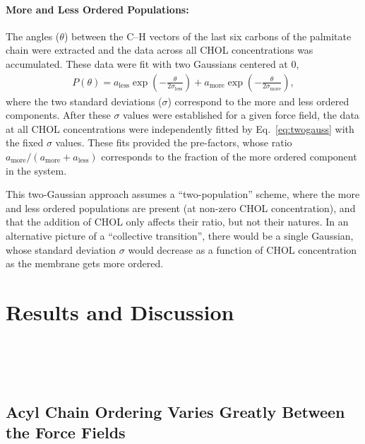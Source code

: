 \documentclass[journal=jctcce]{achemso}
\begin{document}
\paragraph{More and Less Ordered Populations:} The angles ($\theta$) between the C--H vectors of the last six carbons of the palmitate chain were extracted and the data across all CHOL concentrations was accumulated. These data were fit with two Gaussians centered at 0,
%
\begin{align}
    P(\theta)=a_\mathrm{less}\exp\left(-\frac{\theta}{2\sigma_\mathrm{less}}\right)+a_\mathrm{more}\exp\left(-\frac{\theta}{2\sigma_\mathrm{more}}\right),
    \label{eq:twogauss}
\end{align}
%
where the two standard deviations ($\sigma$) correspond to the more and less ordered components. After these $\sigma$ values were established for a given force field, the data at all CHOL concentrations were independently fitted by Eq.~\eqref{eq:twogauss} with the fixed $\sigma$ values. These fits provided the pre-factors, whose ratio $a_\mathrm{more}/(a_\mathrm{more}+a_\mathrm{less})$ corresponds to the fraction of the more ordered component in the system. 

This two-Gaussian approach assumes a ``two-population'' scheme, where the more and less ordered populations are present (at non-zero CHOL concentration), and that the addition of CHOL only affects their ratio, but not their natures. In an alternative picture of a ``collective transition'', there would be a single Gaussian, whose standard deviation $\sigma$ would decrease as a function of CHOL concentration as the membrane gets more ordered.



\section{Results and Discussion}

\\
\\
\\

\subsection{Acyl Chain Ordering Varies Greatly Between the Force Fields}
\end{document}
